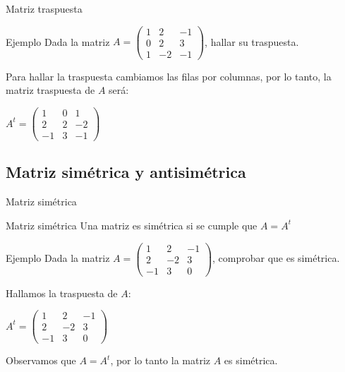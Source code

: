 \documentclass[9pt]{beamer}
\begin{document}
\begin{frame}{Matriz traspuesta}
\begin{exampleblock}{Ejemplo}
Dada la matriz $A=\begin{pmatrix} 1 & 2 & -1 \\ 0 & 2 & 3 \\ 1 & -2 & -1 \end{pmatrix}$, hallar su traspuesta.
\end{exampleblock}

Para hallar la traspuesta cambiamos las filas por columnas, por lo tanto, la matriz traspuesta de $A$ será:

$A^t = \begin{pmatrix} 1 & 0 & 1 \\ 2 & 2 & -2 \\ -1 & 3 & -1 \end{pmatrix}$

\end{frame}
\subsection{Matriz simétrica y antisimétrica}

\begin{frame}{Matriz simétrica}
\begin{alertblock}{Matriz simétrica}
Una matriz es simétrica si se cumple que $A=A^t$
\end{alertblock}

\begin{exampleblock}{Ejemplo}
Dada la matriz $A=\begin{pmatrix} 1 & 2 & -1 \\ 2 & -2 & 3 \\ -1 & 3 & 0 \end{pmatrix}$, comprobar que es simétrica.
\end{exampleblock}

Hallamos  la traspuesta de $A$:

$A^t = \begin{pmatrix} 1 & 2 & -1 \\ 2 & -2 & 3 \\ -1 & 3 & 0 \end{pmatrix}$

Observamos que $A=A^t$, por lo tanto la matriz $A$ es simétrica.
\end{frame}
\end{document}
